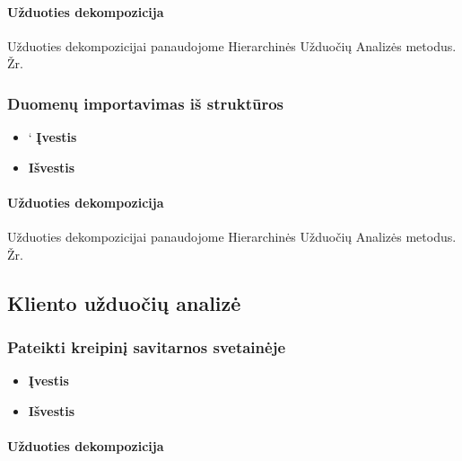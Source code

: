 		
	\paragraph{Užduoties dekompozicija}

	
	Užduoties dekompozicijai panaudojome Hierarchinės Užduočių Analizės metodus.
	Žr. 
	
	
	\subsubsection{Duomenų importavimas iš struktūros}

		\begin{itemize}
			\item` \textbf{Įvestis}
			\item \textbf{Išvestis} 
		\end{itemize}

		
	\paragraph{Užduoties dekompozicija}

	
	Užduoties dekompozicijai panaudojome Hierarchinės Užduočių Analizės metodus.
	Žr. 
	
	
\subsection{Kliento užduočių analizė}

	\subsubsection{Pateikti kreipinį savitarnos svetainėje}
		
		\begin{itemize}
			\item \textbf{Įvestis}
			\item \textbf{Išvestis} 
		\end{itemize}


	\paragraph{Užduoties dekompozicija}

